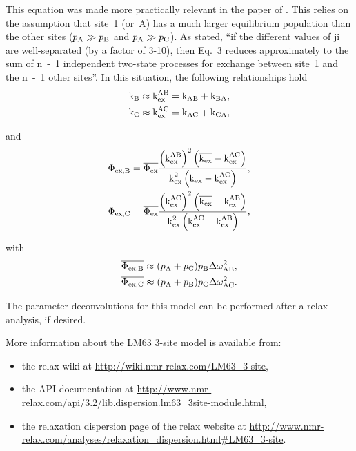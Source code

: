 This equation was made more practically relevant in the paper of \citet{OConnell09}.
This relies on the assumption that site~1 (or~A) has a much larger equilibrium population than the other sites ($p_{\textrm{A}} \gg p_{\textrm{B}}$ and $p_{\textrm{A}} \gg p_{\textrm{C}}$).
As stated, ``if the different values of ji are well-separated (by a factor of 3-10), then Eq.~3 reduces approximately to the sum of n~-~1 independent two-state processes for exchange between site~1 and the n~-~1 other sites''.
In this situation, the following relationships hold
\begin{subequations}
\begin{align}
    &\textrm{k}_{\textrm{B}} \approx \textrm{k}_{\textrm{ex}}^{\textrm{AB}} = \textrm{k}_{\textrm{AB}} + \textrm{k}_{\textrm{BA}} , \\
    &\textrm{k}_{\textrm{C}} \approx \textrm{k}_{\textrm{ex}}^{\textrm{AC}} = \textrm{k}_{\textrm{AC}} + \textrm{k}_{\textrm{CA}} ,
\end{align}
\end{subequations}

and
\begin{subequations}
\begin{align}
    &\Phi_{\textrm{ex,B}} = \overline{\Phi_{\textrm{ex}}} \frac{\left(\textrm{k}_{\textrm{ex}}^{\textrm{AB}}\right)^2 \left( \overline{\textrm{k}_{\textrm{ex}}} - \textrm{k}_{\textrm{ex}}^{\textrm{AC}} \right)}{\textrm{k}_{\textrm{ex}}^2 \left( \textrm{k}_{\textrm{ex}} - \textrm{k}_{\textrm{ex}}^{\textrm{AC}} \right)} , \label{eq: disp phiexB} \\
    &\Phi_{\textrm{ex,C}} = \overline{\Phi_{\textrm{ex}}} \frac{\left(\textrm{k}_{\textrm{ex}}^{\textrm{AC}}\right)^2 \left( \overline{\textrm{k}_{\textrm{ex}}} - \textrm{k}_{\textrm{ex}}^{\textrm{AB}} \right)}{\textrm{k}_{\textrm{ex}}^2 \left( \textrm{k}_{\textrm{ex}}^{\textrm{AC}} - \textrm{k}_{\textrm{ex}}^{\textrm{AB}} \right)} , \label{eq: disp phiexC}
\end{align}
\end{subequations}

with
\begin{subequations}
\begin{align}
    &\overline{\Phi_{\textrm{ex,B}}} \approx (p_{\textrm{A}} + p_{\textrm{C}}) p_{\textrm{B}} \Delta\omega_{\textrm{AB}}^2 , \\
    &\overline{\Phi_{\textrm{ex,C}}} \approx (p_{\textrm{A}} + p_{\textrm{B}}) p_{\textrm{C}} \Delta\omega_{\textrm{AC}}^2 .
\end{align}
\end{subequations}

The parameter deconvolutions for this model can be performed after a relax analysis, if desired.

More information about the LM63 3-site model is available from:
\begin{itemize}
  \item the relax wiki at \url{http://wiki.nmr-relax.com/LM63\_3-site},
  \item the API documentation at \url{http://www.nmr-relax.com/api/3.2/lib.dispersion.lm63\_3site-module.html},
  \item the relaxation dispersion page of the relax website at \url{http://www.nmr-relax.com/analyses/relaxation\_dispersion.html#LM63\_3-site}.
\end{itemize}


